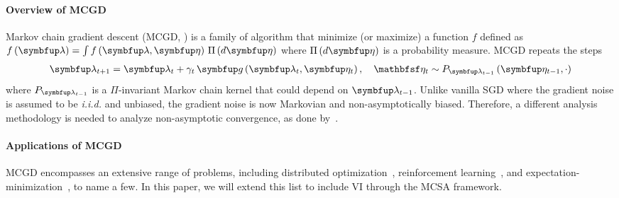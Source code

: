 \paragraph{\textbf{Overview of MCGD}}
Markov chain gradient descent (MCGD, \citealt{duchi_ergodic_2012, NEURIPS2018_1371bcce}) is a family of algorithm that minimize (or maximize) a function \(f\) defined as \(f\left(\vlambda\right) = \int f\left(\vlambda, \veta\right) \, \Pi\left(d\veta\right)\) where \(\Pi\left(d\veta\right)\) is a probability measure.
MCGD repeats the steps 
{%
\begin{align}
  \vlambda_{t+1}    = \vlambda_{t} + \gamma_t \, \vg\left(\vlambda_t, \veta_{t}\right),\quad 
  \rvveta_{t}  \sim P_{\vlambda_{t-1}}\left( \veta_{t-1}, \cdot \right)\label{eq:mcgd}
\end{align}
}%
where \(P_{\vlambda_{t-1}}\) is a \(\Pi\)-invariant Markov chain kernel that could depend on \(\vlambda_{t-1}\).
Unlike vanilla SGD where the gradient noise is assumed to be \textit{i.i.d.} and unbiased, the gradient noise is now Markovian and non-asymptotically biased.
Therefore, a different analysis methodology is needed to analyze non-asymptotic convergence, as done by~\citep{duchi_ergodic_2012, NEURIPS2018_1371bcce, pmlr-v99-karimi19a, doan_finitetime_2020, doan_convergence_2020, Xiong_Xu_Liang_Zhang_2021, debavelaere_convergence_2021}.

\vspace{-0.1in}
\paragraph{\textbf{Applications of MCGD}}
MCGD encompasses an extensive range of problems, including distributed optimization~\citep{ram_incremental_2009}, reinforcement learning~\citep{tadic_asymptotic_2017, doan_convergence_2020, Xiong_Xu_Liang_Zhang_2021}, and expectation-minimization~\citep{pmlr-v99-karimi19a}, to name a few.
In this paper, we will extend this list to include VI through the MCSA framework.

